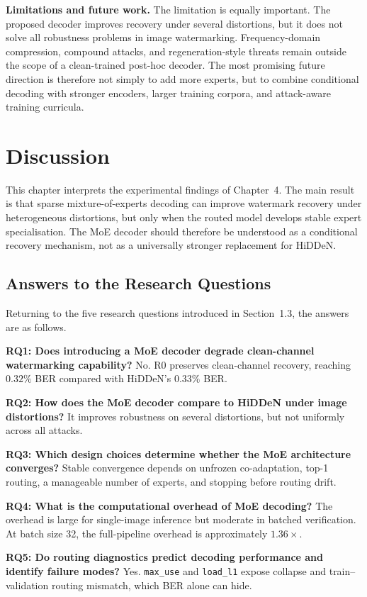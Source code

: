 ﻿\documentclass[12pt, a4paper, twoside]{report}
\numberwithin{equation}{chapter}
\begin{document}
\textbf{Limitations and future work.} The limitation is equally important. The proposed decoder improves recovery under several distortions, but it does not solve all robustness problems in image watermarking. Frequency-domain compression, compound attacks, and regeneration-style threats remain outside the scope of a clean-trained post-hoc decoder. The most promising future direction is therefore not simply to add more experts, but to combine conditional decoding with stronger encoders, larger training corpora, and attack-aware training curricula.
\chapter{Discussion}
\label{ch:discussion}

This chapter interprets the experimental findings of Chapter~4. The main result is that sparse mixture-of-experts decoding can improve watermark recovery under heterogeneous distortions, but only when the routed model develops stable expert specialisation. The MoE decoder should therefore be understood as a conditional recovery mechanism, not as a universally stronger replacement for HiDDeN.

\section{Answers to the Research Questions}

Returning to the five research questions introduced in Section~1.3, the answers are as follows.

\textbf{RQ1: Does introducing a MoE decoder degrade clean-channel watermarking capability?} No. R0 preserves clean-channel recovery, reaching $0.32\%$ BER compared with HiDDeN's $0.33\%$ BER.

\textbf{RQ2: How does the MoE decoder compare to HiDDeN under image distortions?} It improves robustness on several distortions, but not uniformly across all attacks.

\textbf{RQ3: Which design choices determine whether the MoE architecture converges?} Stable convergence depends on unfrozen co-adaptation, top-1 routing, a manageable number of experts, and stopping before routing drift.

\textbf{RQ4: What is the computational overhead of MoE decoding?} The overhead is large for single-image inference but moderate in batched verification. At batch size 32, the full-pipeline overhead is approximately $1.36\times$.

\textbf{RQ5: Do routing diagnostics predict decoding performance and identify failure modes?} Yes. \texttt{max\_use} and \texttt{load\_l1} expose collapse and train--validation routing mismatch, which BER alone can hide.
\end{document}
